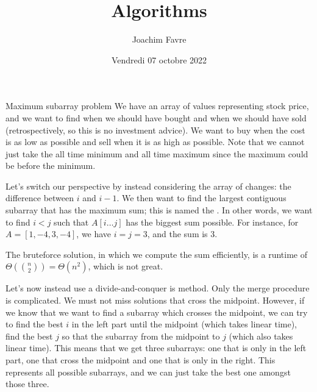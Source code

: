 \documentclass[a4paper]{article}
\title{Algorithms}
\author{Joachim Favre}
\date{Vendredi 07 octobre 2022}
\begin{document}
\maketitle


\begin{parag}{Maximum subarray problem}
    We have an array of values representing stock price, and we want to find when we should have bought and when we should have sold (retrospectively, so this is no investment advice). We want to buy when the cost is as low as possible and sell when it is as high as possible. Note that we cannot just take the all time minimum and all time maximum since the maximum could be before the minimum.

    Let's switch our perspective by instead considering the array of changes: the difference between $i$ and $i-1$. We then want to find the largest contiguous subarray that has the maximum sum; this is named the . In other words, we want to find $i < j$ such that $A\left[i\ldots j\right]$ has the biggest sum possible. For instance, for $A = \left[1, -4, 3, -4\right]$, we have $i = j = 3$, and the sum is 3.

    The bruteforce solution, in which we compute the sum efficiently, is a runtime of $\Theta\left(\binom{n}{2}\right) = \Theta\left(n^2\right)$, which is not great.

    Let's now instead use a divide-and-conquer is method. Only the merge procedure is complicated. We must not miss solutions that cross the midpoint. However, if we know that we want to find a subarray which crosses the midpoint, we can try to find the best $i$ in the left part until the midpoint (which takes linear time), find the best $j$ so that the subarray from the midpoint to $j$ (which also takes linear time). This means that we get three subarrays: one that is only in the left part, one that cross the midpoint and one that is only in the right. This represents all possible subarrays, and we can just take the best one amongst those three.


\end{parag}
\end{document}
